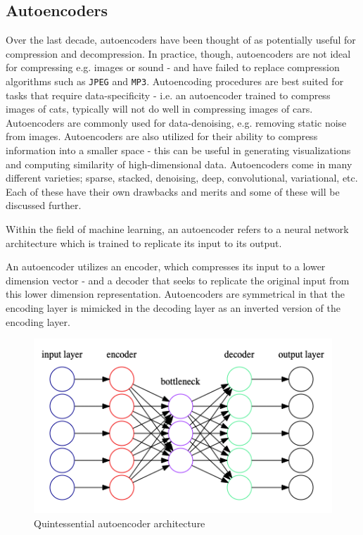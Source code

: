 \subsection{Autoencoders} \label{sec:Autoencoders}
Over the last decade, autoencoders have been thought of as potentially useful for compression and decompression. 
In practice, though, autoencoders are not ideal for compressing e.g. images or sound - and have failed to replace compression algorithms such as \texttt{JPEG} and \texttt{MP3}.
Autoencoding procedures are best suited for tasks that require data-specificity - i.e. an autoencoder trained to compress images of cats, typically will not do well in compressing images of cars. 
\newline
Autoencoders are commonly used for data-denoising, e.g. removing static noise from images. 
Autoencoders are also utilized for their ability to compress information into a smaller space - this can be useful in generating visualizations and computing similarity of high-dimensional data. 
\newline
Autoencoders come in many different varieties; sparse, stacked, denoising, deep, convolutional, variational, etc. Each of these have their own drawbacks and merits and some of these will be discussed further.

Within the field of machine learning, an autoencoder refers to a neural network architecture which is trained to replicate its input to its output\autocite{Bengio2009}.

An autoencoder utilizes an encoder, which compresses its input to a lower dimension vector - and a decoder that seeks to replicate the original input from this lower dimension representation.
Autoencoders are symmetrical in that the encoding layer is mimicked in the decoding layer as an inverted version of the encoding layer.

\begin{figure}[H]
    \centering
    \includegraphics[scale=0.4]{pictures/graphviz/autoencoder_simple}
    \caption{Quintessential autoencoder architecture}
    \label{fig:simpleautoencoder}
\end{figure}

